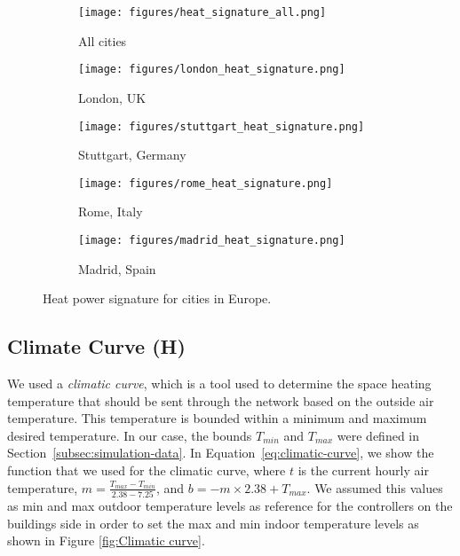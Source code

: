 \documentclass{article}
\begin{document}
\begin{figure}[H]
\begin{subfigure}{\textwidth}
\texttt{[image: figures/heat\_signature\_all.png]}
\caption{All cities}
\label{fig:heat_signature_all}
\end{subfigure}

\begin{subfigure}{0.5\textwidth}
\texttt{[image: figures/london\_heat\_signature.png]}
\caption{London, UK}
\label{fig:heat_signature_london}
\end{subfigure}
\begin{subfigure}{0.5\textwidth}
\texttt{[image: figures/stuttgart\_heat\_signature.png]}
\caption{Stuttgart, Germany}
\label{fig:heat_signature_stuttgart}
\end{subfigure}

\begin{subfigure}{0.5\textwidth}
\texttt{[image: figures/rome\_heat\_signature.png]}
\caption{Rome, Italy}
\label{fig:heat_signature_rome}
\end{subfigure}
\begin{subfigure}{0.5\textwidth}
\texttt{[image: figures/madrid\_heat\_signature.png]}
\caption{Madrid, Spain}
\label{fig:heat_signature_spain}
\end{subfigure}

\caption{Heat power signature for cities in Europe.}
\label{fig:heat_signature_europe}
\end{figure}

\subsection{Climate Curve (H)}

We used a \emph{climatic curve}, which is a tool used to determine the space heating temperature that should be sent through the network based on the outside air temperature. This temperature is bounded within a minimum and maximum desired temperature. In our case, the bounds $T_{min}$ and $T_{max}$ were defined in Section~\ref{subsec:simulation-data}. In Equation~\ref{eq:climatic-curve}, we show the function that we used for the climatic curve, where $t$ is the current hourly air temperature, $m = \frac{T_{max} - T_{min}}{2.38 - 7.25}$, and $b = -m \times 2.38 + T_{max}$. We assumed this values as min and max outdoor temperature levels as reference for the controllers on the buildings side in order to set the max and min indoor temperature levels as shown in Figure \ref{fig:Climatic curve}.
\end{document}
